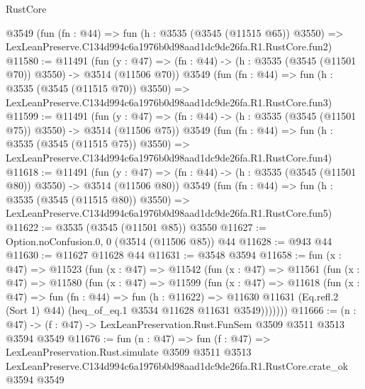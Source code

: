 \begin{lexlean}{RustCore}
\begin{coremodule}
    @3549
    (fun (fn : @44) =>
    fun (h : @3535 (@3545 (@11515 @65)) @3550) =>
    LexLeanPreserve.C134d994c6a1976b0d98aad1dc9de26fa.R1.RustCore.fun2)
@11580 := @11491
    (fun (y : @47) => (fn : @44) -> (h : @3535 (@3545 (@11501 @70)) @3550) -> @3514 (@11506 @70))
    @3549
    (fun (fn : @44) =>
    fun (h : @3535 (@3545 (@11515 @70)) @3550) =>
    LexLeanPreserve.C134d994c6a1976b0d98aad1dc9de26fa.R1.RustCore.fun3)
@11599 := @11491
    (fun (y : @47) => (fn : @44) -> (h : @3535 (@3545 (@11501 @75)) @3550) -> @3514 (@11506 @75))
    @3549
    (fun (fn : @44) =>
    fun (h : @3535 (@3545 (@11515 @75)) @3550) =>
    LexLeanPreserve.C134d994c6a1976b0d98aad1dc9de26fa.R1.RustCore.fun4)
@11618 := @11491
    (fun (y : @47) => (fn : @44) -> (h : @3535 (@3545 (@11501 @80)) @3550) -> @3514 (@11506 @80))
    @3549
    (fun (fn : @44) =>
    fun (h : @3535 (@3545 (@11515 @80)) @3550) =>
    LexLeanPreserve.C134d994c6a1976b0d98aad1dc9de26fa.R1.RustCore.fun5)
@11622 := @3535 (@3545 (@11501 @85)) @3550
@11627 := Option.noConfusion.{0, 0} (@3514 (@11506 @85)) @44
@11628 := @943 @44
@11630 := @11627 @11628 @44
@11631 := @3548 @3594
@11658 := fun (x : @47) =>
  @11523
    (fun (x : @47) =>
    @11542
      (fun (x : @47) =>
      @11561
        (fun (x : @47) =>
        @11580
          (fun (x : @47) =>
          @11599
            (fun (x : @47) =>
            @11618
              (fun (x : @47) =>
              fun (fn : @44) =>
              fun (h : @11622) =>
              @11630
                @11631
                (Eq.refl.{2} (Sort 1) @44)
                (heq_of_eq.{1} @3534 @11628 @11631 @3549)))))))
@11666 := (n : @47) -> (f : @47) -> LexLeanPreservation.Rust.FunSem @3509 @3511 @3513 @3594 @3549
@11676 := fun (n : @47) =>
  fun (f : @47) =>
  LexLeanPreservation.Rust.simulate
    @3509
    @3511
    @3513
    LexLeanPreserve.C134d994c6a1976b0d98aad1dc9de26fa.R1.RustCore.crate_ok
    @3594
    @3549
\end{coremodule}
\end{lexlean}
